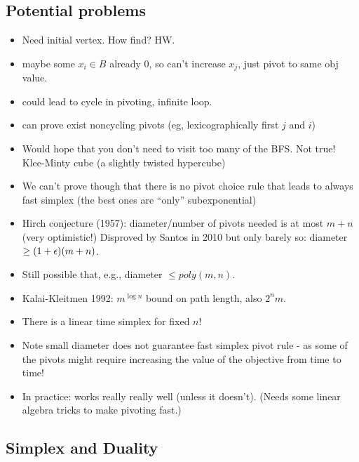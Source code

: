 \documentclass{article}
\begin{document}
\subsection{Potential problems}
\begin{itemize}
	\item Need initial vertex.  How find?  HW.
	\item maybe some $x_i \in B$ already 0, so can't increase $x_j$, just
	pivot to same obj value.
	\item could lead to cycle in pivoting, infinite loop.
	\item can prove exist noncycling pivots (eg, lexicographically first
	$j$ and $i$)
			\item Would hope that you don't need to visit too many of the BFS. Not true! Klee-Minty cube (a slightly twisted hypercube)
		\item We can't prove though that there is no pivot choice rule that leads to always fast simplex (the best ones are ``only'' subexponential)
		\item Hirch conjecture (1957): diameter/number of pivots needed is at most $m+n$ (very optimistic!) Disproved by Santos in 2010 but only barely so: diameter $\geq (1+\epsilon)(m+n)$. 
		\item Still possible that, e.g., diameter $\leq poly(m,n)$. 
	\item Kalai-Kleitmen 1992: $m^{\log n}$ bound on path length,
also $2^n m$.
		\item There is a linear time simplex for fixed $n$!
		\item Note small diameter does not guarantee fast simplex pivot rule - as some of the pivots might require increasing the value of the objective from time to time!
		\item In practice: works really really well (unless it doesn't). (Needs some linear algebra tricks to make pivoting fast.)
	\end{itemize}


\subsection{Simplex and Duality}
\end{document}
